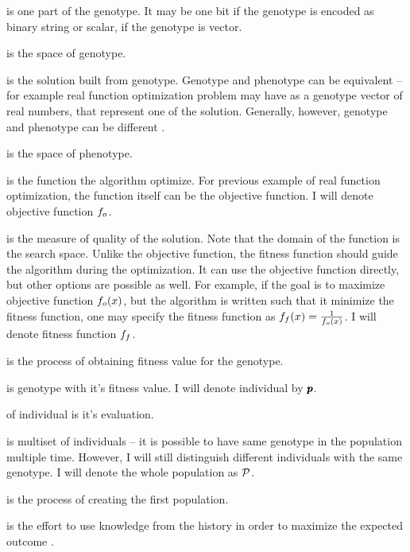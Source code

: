  is one part of the genotype. It may be one bit if the genotype is encoded as binary string or scalar, if the genotype is vector. 

 is the space of genotype.

 is the solution built from genotype. Genotype and phenotype can be equivalent -- for example real function optimization problem may have as a genotype vector of real numbers, that represent one of the solution. Generally, however, genotype and phenotype can be different \citep{GeneticAlgorithmEssentials}.

 is the space of phenotype.

 is the function the algorithm optimize. For previous example of real function optimization, the function itself can be the objective function. I will denote objective function $f_o$.

 is the measure of quality of the solution. Note that the domain of the function is the search space. Unlike the objective function, the fitness function should guide the algorithm during the optimization. It can use the objective function directly, but other options are possible as well. For example, if the goal is to maximize objective function $f_o(x)$, but the algorithm is written such that it minimize the fitness function, one may specify the fitness function as $f_f(x)=\frac{1}{f_o(x)}$. I will denote fitness function $f_f$.

 is the process of obtaining fitness value for the genotype.

 is genotype with it's fitness value. I will denote individual by $\pmb{p}$.

 of individual is it's evaluation. 

 is multiset of individuals -- it is possible to have same genotype in the population multiple time. However, I will still distinguish different individuals with the same genotype. I will denote the whole population as $\mathcal{P}$.

 is the process of creating the first population.

 is the effort to use knowledge from the history in order to maximize the expected outcome \citep{SelfAdaptiveFeaturesInRealParameterEvolutionaryAlgorithms}.

